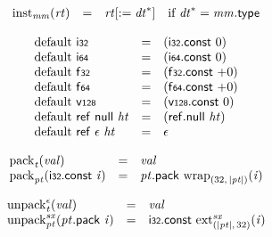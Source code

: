 \vspace{1ex}

$$
\begin{array}{@{}lcl@{}l@{}}
{{\mathrm{inst}}}_{{\mathit{mm}}}({\mathit{rt}}) &=& {{\mathit{rt}}}{[{ := }\;{{\mathit{dt}}^\ast}]} &\quad
  \mbox{if}~{{\mathit{dt}}^\ast} = {\mathit{mm}}.\mathsf{type} \\
\end{array}
$$

\vspace{1ex}

\vspace{1ex}

$$
\begin{array}{@{}lcl@{}l@{}}
{\mathrm{default}}~\mathsf{i{\scriptstyle32}} &=& (\mathsf{i{\scriptstyle32}}.\mathsf{const}~0) &  \\
{\mathrm{default}}~\mathsf{i{\scriptstyle64}} &=& (\mathsf{i{\scriptstyle64}}.\mathsf{const}~0) &  \\
{\mathrm{default}}~\mathsf{f{\scriptstyle32}} &=& (\mathsf{f{\scriptstyle32}}.\mathsf{const}~{+0}) &  \\
{\mathrm{default}}~\mathsf{f{\scriptstyle64}} &=& (\mathsf{f{\scriptstyle64}}.\mathsf{const}~{+0}) &  \\
{\mathrm{default}}~\mathsf{v{\scriptstyle128}} &=& (\mathsf{v{\scriptstyle128}}.\mathsf{const}~0) &  \\
{\mathrm{default}}~\mathsf{ref}~\mathsf{null}~{\mathit{ht}} &=& (\mathsf{ref.null}~{\mathit{ht}}) &  \\
{\mathrm{default}}~\mathsf{ref}~\epsilon~{\mathit{ht}} &=& \epsilon &  \\
\end{array}
$$

\vspace{1ex}

$$
\begin{array}{@{}lcl@{}l@{}}
{{\mathrm{pack}}}_{{\mathit{t}}}({\mathit{val}}) &=& {\mathit{val}} &  \\
{{\mathrm{pack}}}_{{\mathit{pt}}}(\mathsf{i{\scriptstyle32}}.\mathsf{const}~{\mathit{i}}) &=& {\mathit{pt}}.\mathsf{pack}~{{{\mathrm{wrap}}}_{(32,\, {|{\mathit{pt}}|})}}{({\mathit{i}})} &  \\
\end{array}
$$

$$
\begin{array}{@{}lcl@{}l@{}}
{{{{\mathrm{unpack}}}_{{\mathit{t}}}^{\epsilon}}}{({\mathit{val}})} &=& {\mathit{val}} &  \\
{{{{\mathrm{unpack}}}_{{\mathit{pt}}}^{{\mathit{sx}}}}}{({\mathit{pt}}.\mathsf{pack}~{\mathit{i}})} &=& \mathsf{i{\scriptstyle32}}.\mathsf{const}~{{{{\mathrm{ext}}}_{({|{\mathit{pt}}|},\, 32)}^{{\mathit{sx}}}}}{({\mathit{i}})} &  \\
\end{array}
$$

